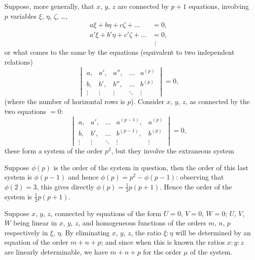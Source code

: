 \documentclass[11pt,a4paper]{article}
\theoremstyle{definition}
\begin{document}
Suppose, more generally, that $x$, $y$, $z$ are connected by $p + 1$ equations, involving $p$ variables $\xi$, $\eta$, $\zeta$, \ldots,
\begin{align*}
a\xi + b\eta + c\zeta + \ldots &= 0, \\
a'\xi + b'\eta + c'\zeta + \ldots &= 0, \\
&\ \,\vdots
\end{align*}
or what comes to the same by the equations (equivalent to two independent relations)
\[
\begin{vmatrix}
a, & a', & a'', & \ldots & a^{(p)} \\
b, & b', & b'', & \ldots & b^{(p)} \\
\vdots & \vdots & \vdots & \ddots & \vdots
\end{vmatrix} = 0,
\]
(where the number of horizontal rows is $p$). Consider $x$, $y$, $z$, as connected by the two equations $= 0$:
\[
\begin{vmatrix}
a, & a', & \ldots & a^{(p-1)}, & a^{(p)} \\
b, & b', & \ldots & b^{(p-1)}, & b^{(p)} \\
\vdots & \vdots & \ddots & \vdots & \vdots
\end{vmatrix} = 0,
\]
these form a system of the order $p^{2}$, but they involve the extraneous system

\newpage

\setcounter{page}{459}

Suppose $\phi(p)$ is the order of the system in question, then the order of this last system is $\phi(p-1)$ and hence $\phi(p) = p^{2} - \phi(p-1)$: observing that $\phi(2) = 3$, this gives directly $\phi(p) = \frac{1}{2}p(p+1)$. Hence the order of the system is $\frac{1}{2}p(p+1)$.

Suppose $x$, $y$, $z$, connected by equations of the form $U = 0$, $V = 0$, $W = 0$; $U$, $V$, $W$ being linear in $x$, $y$, $z$, and homogeneous functions of the orders $m$, $n$, $p$ respectively in $\xi$, $\eta$. By eliminating $x$, $y$, $z$, the ratio $\xi : \eta$ will be determined by an equation of the order $m + n + p$; and since when this is known the ratios $x : y : z$ are linearly determinable, we have $m + n + p$ for the order $\mu$ of the system.
\end{document}
